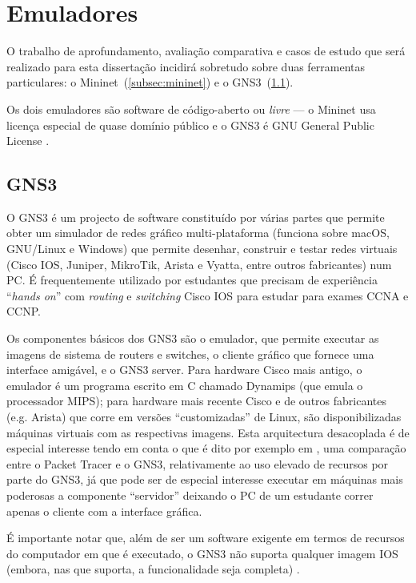 \section{Emuladores}

O trabalho de aprofundamento, avaliação comparativa e casos de estudo que será realizado para esta dissertação incidirá sobretudo sobre duas ferramentas particulares: o Mininet~(\ref{subsec:mininet}) e o GNS3~(\ref{subsec:gns3}).

Os dois emuladores são software de código-aberto ou \emph{livre} \cite{freesoftdefinition} --- o Mininet usa licença especial de quase domínio público \cite{mininetlicense} e o GNS3 é GNU General Public License \cite{gplv3}.

\subsection{GNS3}
\label{subsec:gns3}

O GNS3 \cite{gns3} é um projecto de software constituído por várias partes que permite obter um simulador de redes gráfico multi-plataforma (funciona sobre macOS, GNU/Linux e Windows) que permite desenhar, construir e testar redes virtuais (Cisco IOS, Juniper, MikroTik, Arista e Vyatta, entre outros fabricantes) num PC. É frequentemente utilizado por estudantes que precisam de experiência ``\emph{hands on}'' com \emph{routing} e \emph{switching} Cisco IOS para estudar para exames CCNA e CCNP.

Os componentes básicos dos GNS3 são o emulador, que permite executar as imagens de sistema de routers e switches, o cliente gráfico que fornece uma interface amigável, e o GNS3 server. Para hardware Cisco mais antigo, o emulador é um programa escrito em C chamado Dynamips (que emula o processador MIPS); para hardware mais recente Cisco e de outros fabricantes (e.g. Arista) que corre em versões ``customizadas'' de Linux, são disponibilizadas máquinas virtuais com as respectivas imagens. Esta arquitectura desacoplada é de especial interesse tendo em conta o que é dito por exemplo em \cite{chou2016comparison}, uma comparação entre o Packet Tracer e o GNS3, relativamente ao uso elevado de recursos por parte do GNS3, já que pode ser de especial interesse executar em máquinas mais poderosas a componente ``servidor'' deixando o PC de um estudante correr apenas o cliente com a interface gráfica.

É importante notar que, além de ser um software exigente em termos de recursos do computador em que é executado, o GNS3 não suporta qualquer imagem IOS (embora, nas que suporta, a funcionalidade seja completa) \cite{chou2016comparison}.

